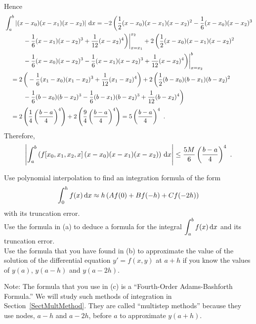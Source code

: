 {\begin{align*}
\end{align*}
Hence
\begin{align*}
&\int_a^b \left|(x-x_0)(x-x_1)(x-x_2) \right|\,\mathrm{d}x
= - 2\, \bigg( \frac{1}{2}(x-x_0)(x-x_1)(x-x_2)^2 -
\frac{1}{6}(x-x_0)(x-x_2)^3 \\
&\quad \qquad - \frac{1}{6}(x-x_1)(x-x_2)^3
+ \frac{1}{12}(x-x_2)^4 \bigg)\bigg|_{x=x_1}^{x_2}
+2\, \bigg( \frac{1}{2}(x-x_0)(x-x_1)(x-x_2)^2 \\
&\quad \qquad - \frac{1}{6}(x-x_0)(x-x_2)^3
- \frac{1}{6}(x-x_1)(x-x_2)^3
+ \frac{1}{12}(x-x_2)^4 \bigg)\bigg|_{x=x_2}^b \\
&\quad =  2\, \bigg( -\frac{1}{6}(x_1-x_0)(x_1-x_2)^3
+ \frac{1}{12}(x_1-x_2)^4 \bigg)
+2\, \bigg( \frac{1}{2}(b-x_0)(b-x_1)(b-x_2)^2  \\
&\quad\qquad  - \frac{1}{6}(b-x_0)(b-x_2)^3
- \frac{1}{6}(b-x_1)(b-x_2)^3 + \frac{1}{12}(b-x_2)^4 \bigg) \\
&\quad =  2\left( \frac{1}{4} \left(\frac{b-a}{4}\right)^4 \right)
  +2 \left( \frac{9}{4} \left(\frac{b-a}{4}\right)^4 \right)
=  5 \left(\frac{b-a}{4}\right)^4  \ .
\end{align*}
Therefore,
\[
\left| \int_a^b \left(f[x_0,x_1,x_2,x]\,(x-x_0)(x-x_1)(x-x_2)
  \right)\,\mathrm{d}x \right| \leq \frac{5 M}{6} \left(\frac{b-a}{4}\right)^4 \ .
\]
}

\begin{question}
 Use polynomial interpolation to find an integration formula
of the form
\[
\int_0^h f(x)\,\mathrm{d}x \approx h\left(A f(0)+B f(-h)+C f(-2h)\right)
\]
with its truncation error.\\
 Use the formula in (a) to deduce a formula for the integral
$\displaystyle \int_a^b f(x)\,\mathrm{d}x$ and its truncation error.\\
 Use the formula that you have found in (b) to approximate the
value of the solution of the differential equation $y' = f(x,y)$ at
$a+h$ if you know the values of $y(a)$, $y(a-h)$ and $y(a-2h)$.

\noindent Note: The formula that you use in (c) is a ``Fourth-Order
Adams-Bashforth Formula.''  We will study such methods of integration in  
Section~\ref{SectMultMethod}.  They are called ``multistep methods''
because they use nodes, $a-h$ and $a-2h$, before $a$ to approximate
$y(a+h)$.
\end{question}

